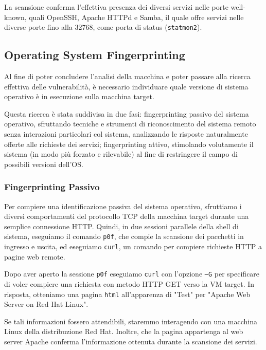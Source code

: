 \documentclass[12pt, a4paper]{article}
\begin{document}
	La scansione conferma l'effettiva presenza dei diversi servizi nelle porte well-known, quali OpenSSH, Apache HTTPd e Samba\cite{samba}, il quale offre servizi nelle diverse porte fino alla 32768, come porta di status (\texttt{statmon2}).
	
	\subsection{Operating System Fingerprinting}
	Al fine di poter concludere l'analisi della macchina e poter passare alla ricerca effettiva delle vulnerabilità, è necessario individuare quale versione di sistema operativo è in esecuzione sulla macchina target.
	
	Questa ricerca è stata suddivisa in due fasi: fingerprinting passivo del sistema operativo, sfruttando tecniche e strumenti di riconoscimento del sistema remoto senza interazioni particolari col sistema, analizzando le risposte naturalmente offerte alle richieste dei servizi; fingerprinting attivo, stimolando volutamente il sistema (in modo più forzato e rilevabile) al fine di restringere il campo di possibili versioni dell'OS.
	
	\subsubsection{Fingerprinting Passivo}
	Per compiere una identificazione passiva del sistema operativo, sfruttiamo i diversi comportamenti del protocollo TCP della macchina target durante una semplice connessione HTTP. Quindi, in due sessioni parallele della shell di sistema, eseguiamo il comando \texttt{p0f}\cite{p0f}, che compie la scansione dei pacchetti in ingresso e uscita, ed eseguiamo \texttt{curl}\cite{curl}, un comando per compiere richieste HTTP a pagine web remote.
	
	
	Dopo aver aperto la sessione \texttt{p0f} eseguiamo \texttt{curl} con l'opzione \texttt{--G} per specificare di voler compiere una richiesta con metodo HTTP GET verso la VM target.
	In risposta, otteniamo una pagina \texttt{html} all'apparenza di "Test" per "Apache Web Server on Red Hat Linux".
	
	Se tali informazioni fossero attendibili, staremmo interagendo con una macchina Linux della distribuzione Red Hat. Inoltre, che la pagina appartenga al web server Apache conferma l'informazione ottenuta durante la scansione dei servizi.
	
\end{document}
